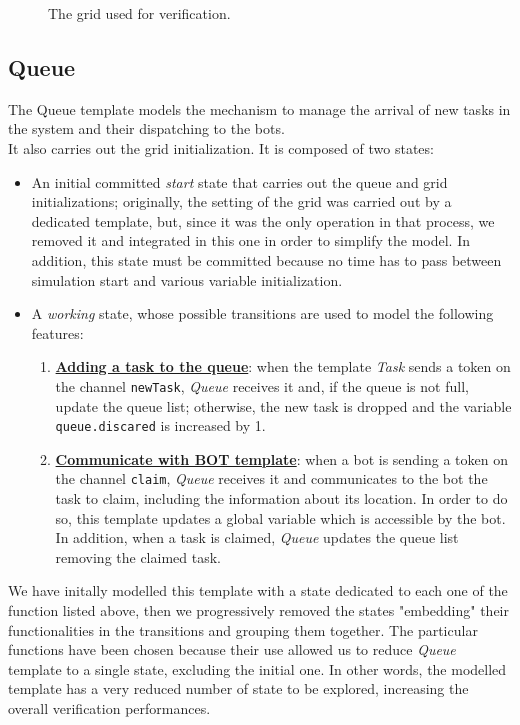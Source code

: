 \documentclass{article}
\begin{document}
\begin{figure}[H]
\begin{minipage}{0.45\textwidth}
						\caption{The grid used for verification.}
					\end{minipage}
				\end{figure}

		\subsection{Queue}
			The Queue template models the mechanism to manage the arrival of new tasks in the system and their dispatching to the bots.\\
			It also carries out the grid initialization. It is composed of two states:
			\begin{itemize}
				\item An initial committed \emph{start} state that carries out the queue and grid initializations; originally, the setting of the grid was carried out by a dedicated template, but, since it was the only operation in that process, we removed it and integrated in this one in order to simplify the model. In addition, this state must be committed because no time has to pass between simulation start and various variable initialization.
				\item A \emph{working} state, whose possible transitions are used to model the following features:
					\begin{enumerate}
						\item \textbf{\underline{Adding a task to the queue}}: when the template \emph{Task} sends a token on the channel \verb|newTask|, \emph{Queue} receives it and, if the queue is not full, update the queue list; otherwise, the new task is dropped and the variable \verb|queue.discared| is increased by 1.
						\item \textbf{\underline{Communicate with BOT template}}: when a bot is sending a token on the channel \verb|claim|, \emph{Queue} receives it and communicates to the bot the task to claim, including the information about its location. In order to do so, this template updates a global variable which is accessible by the bot. In addition, when a task is claimed, \emph{Queue} updates the queue list removing the claimed task.
					\end{enumerate}
			\end{itemize}
			We have initally modelled this template with a state dedicated to each one of the function listed above, then we progressively removed the states "embedding" their functionalities in the transitions and grouping them together. 					The particular functions have been chosen because their use allowed us to reduce \emph{Queue} template to a single state, excluding the initial one. In other words, the modelled template has a very reduced number of state to be explored, increasing the overall verification performances.
		
\end{document}

